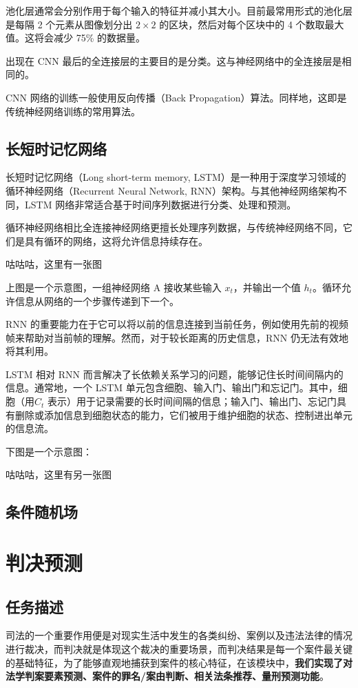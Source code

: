 池化层通常会分别作用于每个输入的特征并减小其大小。目前最常用形式的池化层是每隔 2 个元素从图像划分出 ${\displaystyle 2\times 2}$ 的区块，然后对每个区块中的 4 个数取最大值。这将会减少 75\% 的数据量。

出现在 CNN 最后的全连接层的主要目的是分类。这与神经网络中的全连接层是相同的。

CNN 网络的训练一般使用反向传播（Back Propagation）算法。同样地，这即是传统神经网络训练的常用算法。


\subsection{长短时记忆网络}

长短时记忆网络（Long short-term memory, LSTM）是一种用于深度学习领域的循环神经网络（Recurrent Neural Network, RNN）架构。与其他神经网络架构不同，LSTM 网络非常适合基于时间序列数据进行分类、处理和预测。

循环神经网络相比全连接神经网络更擅长处理序列数据，与传统神经网络不同，它们是具有循环的网络，这将允许信息持续存在。

咕咕咕，这里有一张图

上图是一个示意图，一组神经网络 A 接收某些输入 ${\displaystyle x_t}$，并输出一个值 ${\displaystyle h_t}$。循环允许信息从网络的一个步骤传递到下一个。

RNN 的重要能力在于它可以将以前的信息连接到当前任务，例如使用先前的视频帧来帮助对当前帧的理解。然而，对于较长距离的历史信息，RNN 仍无法有效地将其利用。

LSTM 相对 RNN 而言解决了长依赖关系学习的问题，能够记住长时间间隔内的信息。通常地，一个 LSTM 单元包含细胞、输入门、输出门和忘记门。其中，细胞（用${\displaystyle C_t}$ 表示）用于记录需要的长时间间隔的信息；输入门、输出门、忘记门具有删除或添加信息到细胞状态的能力，它们被用于维护细胞的状态、控制进出单元的信息流。

下图是一个示意图：

咕咕咕，这里有另一张图


\subsection{条件随机场}
\fi

\section{判决预测}
\subsection{任务描述}
司法的一个重要作用便是对现实生活中发生的各类纠纷、案例以及违法法律的情况进行裁决，而判决就是体现这个裁决的重要场景，而判决结果是每一个案件最关键的基础特征，为了能够直观地捕获到案件的核心特征，在该模块中，\textbf{我们实现了对法学判案要素预测、案件的罪名/案由判断、相关法条推荐、量刑预测功能}。

